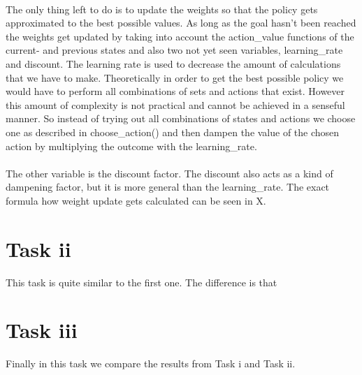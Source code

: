 \documentclass{article}
\begin{document}
	\\
	The only thing left to do is to update the weights so that the policy gets approximated to the best possible values. As long as the goal hasn't been reached the weights get updated by taking into account the action\_value functions of the current- and previous states and also two not yet seen variables, learning\_rate and discount. The learning rate is used to decrease the amount of calculations that we have to make. Theoretically in order to get the best possible policy we would have to perform all combinations of sets and actions that exist. However this amount of complexity is not practical and cannot be achieved in a senseful manner. So instead of trying out all combinations of states and actions we choose one as described in choose\_action() and then dampen the value of the chosen action by multiplying the outcome with the learning\_rate. \\
	\\
	The other variable is the discount factor. The discount also acts as a kind of dampening factor, but it is more general than the learning\_rate. The exact formula how weight update gets calculated can be seen in X. 
	
	
	
	
	
	\section{Task ii}
	This task is quite similar to the first one. The difference is that 
	
	
	\section{Task iii}
	Finally in this task we compare the results from Task i and Task ii. 
	
	
	
	
\end{document}
